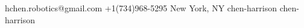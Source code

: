 \documentclass{resume}
\begin{document}
\begin{small}
 hchen.robotics@gmail.com \quad
{} +1(734)968-5295 \quad
{} New York, NY \quad
{} chen-harrison \quad
{} chen-harrison \\
\end{small}
\horiline{1pt}
\end{document}
